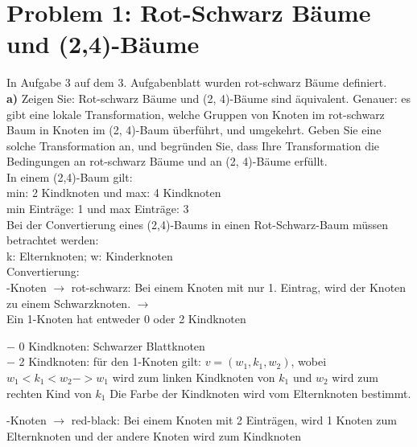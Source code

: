 
\section*{Problem 1: Rot-Schwarz Bäume und (2,4)-Bäume}

In Aufgabe 3 auf dem 3. Aufgabenblatt wurden rot-schwarz Bäume definiert.\\


\textbf{a)} Zeigen Sie: Rot-schwarz Bäume und (2, 4)-Bäume sind äquivalent. Genauer: es gibt eine lokale Transformation, welche Gruppen von Knoten im rot-schwarz Baum in Knoten im (2, 4)-Baum überführt, und umgekehrt. Geben Sie eine
solche Transformation an, und begründen Sie, dass Ihre Transformation die Bedingungen an rot-schwarz Bäume und an (2, 4)-Bäume erfüllt.\\

\noindent
In einem (2,4)-Baum gilt:\\
min: 2 Kindknoten und max: 4 Kindknoten\\
min Einträge: 1 und max Einträge: 3\\
Bei der Convertierung eines (2,4)-Baums in einen Rot-Schwarz-Baum müssen betrachtet werden:\\
k: Elternknoten; w: Kinderknoten\\
Convertierung:\\

-Knoten $\rightarrow$ rot-schwarz: Bei einem Knoten mit nur 1. Eintrag, wird der Knoten zu einem Schwarzknoten. $\rightarrow$\\
Ein 1-Knoten hat entweder 0 oder 2 Kindknoten\\

\begin{addmargin}[1em]{1em}
$-$ 0 Kindknoten: Schwarzer Blattknoten\\
$-$ 2 Kindknoten: für den 1-Knoten gilt: $v = (w_1,k_1,w_2)$, wobei $w_1 < k_1 < w_2 -> w_1$ wird zum linken Kindknoten von $k_1$ und $w_2$ wird zum rechten Kind von $k_1$ Die Farbe der Kindknoten wird vom Elternknoten bestimmt.\\
\end{addmargin}
-Knoten $\rightarrow$ red-black: Bei einem Knoten mit 2 Einträgen, wird 1 Knoten zum Elternknoten und der andere Knoten wird zum Kindknoten\\

